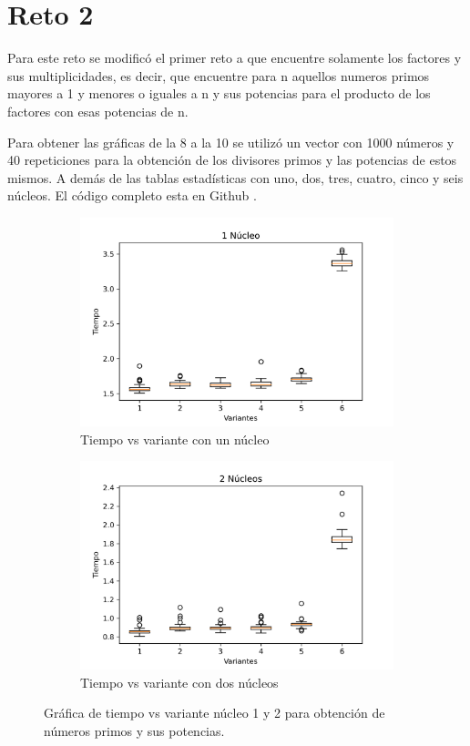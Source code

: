 \documentclass{article}
\begin{document}
\section{Reto 2}
Para este reto se modificó el primer reto a que encuentre solamente los factores y sus multiplicidades, es decir, que encuentre para n aquellos numeros primos mayores a 1 y menores o iguales a n y sus potencias para el producto de los factores con esas potencias de n.

Para obtener las gráficas de la 8 a la 10 se utilizó un vector con 1000 números y 40 repeticiones para la obtención de los divisores primos y las potencias de estos mismos. A demás de las tablas estadísticas con uno, dos, tres, cuatro, cinco y seis núcleos. El código completo esta en Github \cite{Denisse_Leyva}.

\begin{figure}[H]
\centering
\begin{subfigure}[b]{0.45\linewidth}
\includegraphics[width=\linewidth]{G_tiempo_1.png}
\caption{Tiempo vs variante con un núcleo}
\end{subfigure}
\begin{subfigure}[b]{0.45\linewidth}
\includegraphics[width=\linewidth]{G_tiempo_2.png}
\caption{Tiempo vs variante con dos núcleos}
\end{subfigure}
\caption{Gráfica de tiempo vs variante núcleo 1 y 2 para obtención de números primos y sus potencias.}
\label{fig:westminster}
\end{figure}
\end{document}
